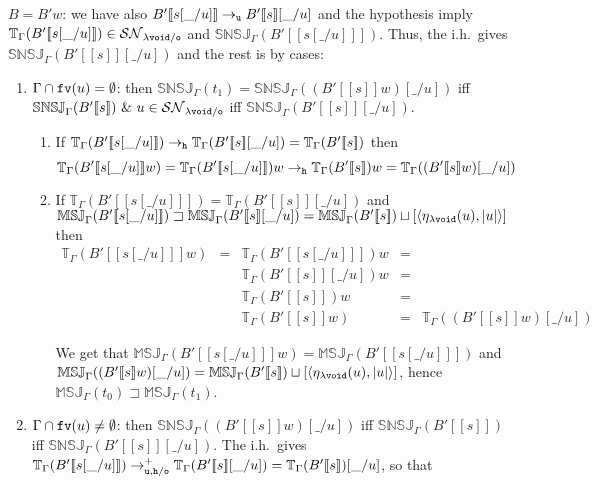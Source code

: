 \documentclass{LMCS}
\renewcommand{\>}{\rightarrow}
\def\lam{\lambda}
\def\Gam{\Gamma}
\newcommand{\Rew}[1]{\rightarrow_{#1}}
\newcommand{\SN}[1]{\mathcal{SN}_{#1}}
\newcommand{\multiset}[1]{ [ #1 ] }
\newcommand{\pair}[2]{\langle #1, #2 \rangle}
\newcommand{\Rewplus}[1]{\rightarrow^{+}_{#1}}
\newcommand{\fv}[1]{{\tt fv}(#1)}
\newcommand{\ems}{\emptyset}
\newcommand{\ih}{i.h.}
\newcommand{\unboxed}{{\tt u}}
\newcommand{\modulo}[2]{#1/#2}
\newcommand{\osym}{{\tt o}}
\newcommand{\osymb}{{\tt o}}
\newcommand{\aux}{{\tt void}}
\newcommand{\laux}{\lam\aux}
\newcommand{\lauxm}{\lam\modulo{ \aux }{ \osymb }}
\newcommand{\New}{{\tt h}}
\newcommand{\snsudd}[2]{\mathbb{SNSJ}_{#1}(#2)}
\newcommand{\ctx}[2]{#1 [ \! [#2] \! ]}
\newcommand{\etamd}[2]{\mathbb{MSJ}_{#1}(#2)}
\newcommand{\surf}[2]{\mathbb{T}_{#1}(#2)}
\newcommand{\void}{\_}
\newcommand{\gm}{\sqsupset}
\begin{document}
\begin{enumerate}[$\bullet$]
\begin{enumerate}[$-$]
{\begin{enumerate}
\end{enumerate}  

\item $B=B' w$: we have also 
  $\ctx{B'}{s[\void/u]}\Rew{\unboxed}\ctx{B'}{s}[\void/u]$ and 
  the hypothesis imply 
  $\surf{\Gam}{\ctx{B'}{s[\void/u]}} \in \SN{\lauxm}$ and
  $\snsudd{\Gam}{\ctx{B'}{s[\void/u]}}$. Thus, the 
  \ih\ gives $\snsudd{\Gam}{\ctx{B'}{s}[\void/u]}$ and the rest is by cases:

\begin{enumerate}
  \item \emph{$\Gam\cap\fv{u}=\ems$}: then
    $\snsudd{\Gam}{t_1}=\snsudd{\Gam}{(\ctx{B'}{s} w)[\void/u]}$ iff
    $\snsudd{\Gam}{\ctx{B'}{s}}\ \&\ u\in\SN{\lauxm}$ iff
    $\snsudd{\Gam}{\ctx{B'}{s}[\void/u]}$.

\begin{enumerate}
\item If $\surf{\Gam}{\ctx{B'}{s[\void/u]}}\Rew{\New}\surf{\Gam}{\ctx{B'}{s}[\void/u]}=\surf{\Gam}{\ctx{B'}{s}}$ then 
$$\surf{\Gam}{\ctx{B'}{s[\void/u]} w}=\surf{\Gam}{\ctx{B'}{s[\void/u]}} w\Rew{\New}\surf{\Gam}{\ctx{B'}{s}} w=\surf{\Gam}{(\ctx{B'}{s} w)[\void/u]}$$

\item If $\surf{\Gam}{\ctx{B'}{s[\void/u]}}= \surf{\Gam}{\ctx{B'}{s}[\void/u]}$ and $\etamd{\Gam}{\ctx{B'}{s[\void/u]}} \gm \etamd{\Gam}{\ctx{B'}{s}[\void/u]}=\etamd{\Gam}{\ctx{B'}{s}}\sqcup \multiset{\pair{\eta_{\laux}(u)}{|u|}}$ then 
\[\begin{array}{llllllll}
\surf{\Gam}{\ctx{B'}{s[\void/u]} w}&=& \surf{\Gam}{\ctx{B'}{s[\void/u]}} w&=\\
&&\surf{\Gam}{\ctx{B'}{s}[\void/u]} w&=\\
&&\surf{\Gam}{\ctx{B'}{s}} w&=\\
&&\surf{\Gam}{\ctx{B'}{s} w}&=&\surf{\Gam}{(\ctx{B'}{s} w)[\void/u]}
\end{array}\]
 
We get that
$\etamd{\Gam}{\ctx{B'}{s[\void/u]} w}=\etamd{\Gam}{\ctx{B'}{s[\void/u]}}$ and
$\etamd{\Gam}{(\ctx{B'}{s} w)[\void/u]}=\etamd{\Gam}{\ctx{B'}{s}}\sqcup
\multiset{\pair{\eta_{\laux}(u)}{|u|}}$,
hence $\etamd{\Gam}{t_0} \gm  \etamd{\Gam}{t_1}$.
\end{enumerate}

\item \emph{$\Gam\cap\fv{u}\neq\ems$}: then
  $\snsudd{\Gam}{(\ctx{B'}{s} w)[\void/u]}$ iff
  $\snsudd{\Gam}{\ctx{B'}{s}}$ iff
  $\snsudd{\Gam}{\ctx{B'}{s}[\void/u]}$. The \ih\ gives
  $\surf{\Gam}{\ctx{B'}{s[\void/u]}}\Rewplus{\modulo{\unboxed,\New}{\osym}}\surf{\Gam}{\ctx{B'}{s}[\void/u]}=\surf{\Gam}{\ctx{B'}{s}}[\void/u]$, so that 


\end{enumerate}}
\end{enumerate}
\end{enumerate}
\end{document}

